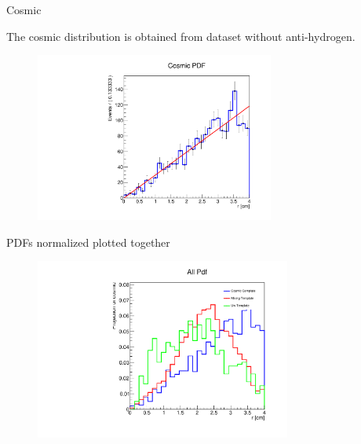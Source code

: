 \documentclass[9pt]{beamer}
\begin{document}
\begin{frame}{Cosmic}

The cosmic distribution is obtained from dataset without anti-hydrogen. 

\begin{figure}
\includegraphics[width = 0.7\textwidth]{./SingleModel/Cosmici_fit.pdf}
\end{figure}

\end{frame}

\begin{frame}{PDFs normalized plotted together}
\begin{figure}
\includegraphics[width = 0.75\textwidth]{PdfTogether.pdf}
\end{figure}
\end{frame}
\end{document}
